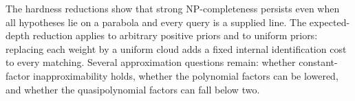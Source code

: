 The hardness reductions show that strong NP-completeness persists even
when all hypotheses lie on a parabola and every query is a supplied
line. The expected-depth reduction applies to arbitrary positive priors
and to uniform priors: replacing each weight by a uniform cloud adds a
fixed internal identification cost to every matching. Several
approximation questions remain: whether constant-factor
inapproximability holds, whether the polynomial factors can be lowered,
and whether the quasipolynomial factors can fall below two.
